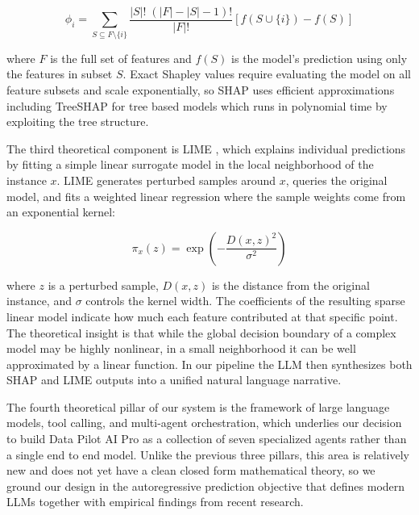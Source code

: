 \documentclass{article}
\begin{document}
\begin{equation}
\phi_i = \sum_{S \subseteq F \setminus \{i\}} \frac{|S|!\;(|F| - |S| - 1)!}{|F|!} \left[f(S \cup \{i\}) - f(S)\right]
\end{equation}

where $F$ is the full set of features and $f(S)$ is the model's prediction
using only the features in subset $S$. Exact Shapley values require
evaluating the model on all feature subsets and scale exponentially, so SHAP
\citep{lundberg2017unified} uses efficient approximations including TreeSHAP
for tree based models which runs in polynomial time by exploiting the tree
structure.

The third theoretical component is LIME \citep{ribeiro2016lime}, which
explains individual predictions by fitting a simple linear surrogate model in
the local neighborhood of the instance $x$. LIME generates perturbed samples
around $x$, queries the original model, and fits a weighted linear regression
where the sample weights come from an exponential kernel:

\begin{equation}
\pi_x(z) = \exp\left(-\frac{D(x, z)^2}{\sigma^2}\right)
\end{equation}

where $z$ is a perturbed sample, $D(x, z)$ is the distance from the original
instance, and $\sigma$ controls the kernel width. The coefficients of the
resulting sparse linear model indicate how much each feature contributed at
that specific point. The theoretical insight is that while the global
decision boundary of a complex model may be highly nonlinear, in a small
neighborhood it can be well approximated by a linear function. In our
pipeline the LLM then synthesizes both SHAP and LIME outputs into a unified
natural language narrative.

The fourth theoretical pillar of our system is the framework of large language
models, tool calling, and multi-agent orchestration, which underlies our
decision to build Data Pilot AI Pro as a collection of seven specialized agents
rather than a single end to end model. Unlike the previous three pillars, this
area is relatively new and does not yet have a clean closed form mathematical
theory, so we ground our design in the autoregressive prediction objective
that defines modern LLMs together with empirical findings from recent research.
\end{document}
